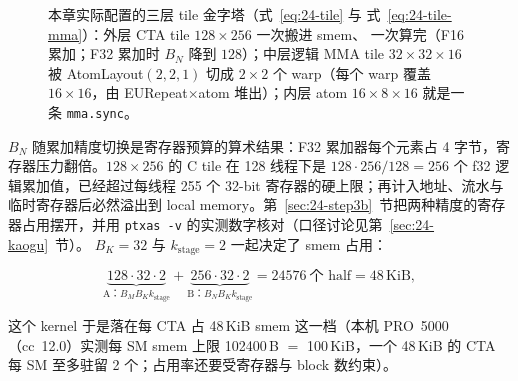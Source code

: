 \begin{figure}[H]
\caption{本章实际配置的三层 tile 金字塔（式~\eqref{eq:24-tile} 与
式~\eqref{eq:24-tile-mma}）：外层 CTA tile $128\times256$ 一次搬进 smem、
一次算完（F16 累加；F32 累加时 $B_N$ 降到 $128$）；中层逻辑 MMA tile
$32\times32\times16$ 被 AtomLayout$(2,2,1)$ 切成 $2\times2$ 个 warp（每个
warp 覆盖 $16\times16$，由 EURepeat$\times$atom 堆出）；内层 atom
$16\times8\times16$ 就是一条 \texttt{mma.sync}。}
\label{fig:24-tile-pyramid}
\end{figure}

$B_N$ 随累加精度切换是寄存器预算的算术结果：F32 累加器每个元素占
4 字节，寄存器压力翻倍。$128\times256$ 的 C tile 在 128 线程下是
$128\cdot256/128=256$ 个 f32 逻辑累加值，已经超过每线程 255 个 32-bit
寄存器的硬上限；再计入地址、流水与临时寄存器后必然溢出到 local memory。第~\ref{sec:24-step3b}~节把两种精度的寄存器占用摆开，并用
\texttt{ptxas -v} 的实测数字核对（口径讨论见第~\ref{sec:24-kaogu}~节）。
$B_K=32$ 与 $k_{\mathrm{stage}}=2$ 一起决定了 smem 占用：

\begin{equation}
  \underbrace{128\cdot32\cdot2}_{\text{A：}\allowbreak{}B_M B_K k_{\mathrm{stage}}}
  +\underbrace{256\cdot32\cdot2}_{\text{B：}\allowbreak{}B_N B_K k_{\mathrm{stage}}}
  = 24576\ \text{个 half} = 48\,\text{KiB},
  \label{eq:24-smem}
\end{equation}

这个 kernel 于是落在每 CTA 占 48\,KiB smem 这一档（本机 PRO~5000
（cc~12.0）实测每 SM smem 上限 102400\,B $=$ 100\,KiB，一个 48\,KiB 的 CTA
每 SM 至多驻留 2 个；占用率还要受寄存器与 block 数约束）。

